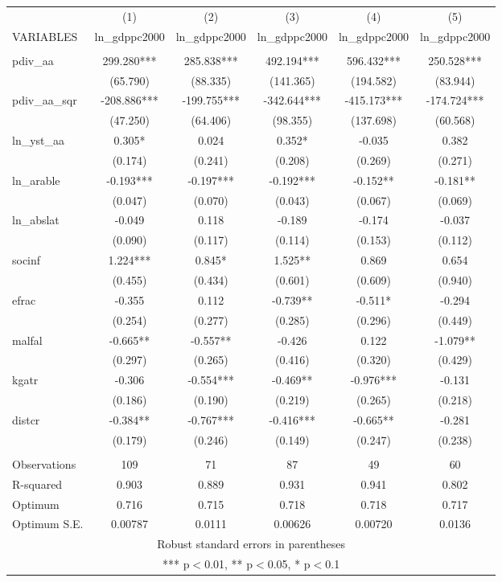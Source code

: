 \documentclass[]{article}
\begin{document}
\begin{tabular}{lccccc} \hline
 & (1) & (2) & (3) & (4) & (5) \\
VARIABLES & ln\_gdppc2000 & ln\_gdppc2000 & ln\_gdppc2000 & ln\_gdppc2000 & ln\_gdppc2000 \\ \hline
 &  &  &  &  &  \\
pdiv\_aa & 299.280*** & 285.838*** & 492.194*** & 596.432*** & 250.528*** \\
 & (65.790) & (88.335) & (141.365) & (194.582) & (83.944) \\
pdiv\_aa\_sqr & -208.886*** & -199.755*** & -342.644*** & -415.173*** & -174.724*** \\
 & (47.250) & (64.406) & (98.355) & (137.698) & (60.568) \\
ln\_yst\_aa & 0.305* & 0.024 & 0.352* & -0.035 & 0.382 \\
 & (0.174) & (0.241) & (0.208) & (0.269) & (0.271) \\
ln\_arable & -0.193*** & -0.197*** & -0.192*** & -0.152** & -0.181** \\
 & (0.047) & (0.070) & (0.043) & (0.067) & (0.069) \\
ln\_abslat & -0.049 & 0.118 & -0.189 & -0.174 & -0.037 \\
 & (0.090) & (0.117) & (0.114) & (0.153) & (0.112) \\
socinf & 1.224*** & 0.845* & 1.525** & 0.869 & 0.654 \\
 & (0.455) & (0.434) & (0.601) & (0.609) & (0.940) \\
efrac & -0.355 & 0.112 & -0.739** & -0.511* & -0.294 \\
 & (0.254) & (0.277) & (0.285) & (0.296) & (0.449) \\
malfal & -0.665** & -0.557** & -0.426 & 0.122 & -1.079** \\
 & (0.297) & (0.265) & (0.416) & (0.320) & (0.429) \\
kgatr & -0.306 & -0.554*** & -0.469** & -0.976*** & -0.131 \\
 & (0.186) & (0.190) & (0.219) & (0.265) & (0.218) \\
distcr & -0.384** & -0.767*** & -0.416*** & -0.665** & -0.281 \\
 & (0.179) & (0.246) & (0.149) & (0.247) & (0.238) \\
 &  &  &  &  &  \\
Observations & 109 & 71 & 87 & 49 & 60 \\
R-squared & 0.903 & 0.889 & 0.931 & 0.941 & 0.802 \\
Optimum & 0.716 & 0.715 & 0.718 & 0.718 & 0.717 \\
 Optimum S.E. & 0.00787 & 0.0111 & 0.00626 & 0.00720 & 0.0136 \\ \hline
\multicolumn{6}{c}{ Robust standard errors in parentheses} \\
\multicolumn{6}{c}{ *** p$<$0.01, ** p$<$0.05, * p$<$0.1} \\
\end{tabular}
\end{document}
